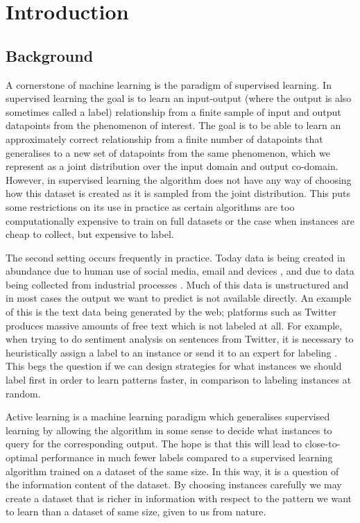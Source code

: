 \chapter{Introduction}
\label{ch:introduction}

\section{Background}
\label{sec:background}
A cornerstone of machine learning is the paradigm of supervised learning. In
supervised learning the goal is to learn an input-output (where the output is
also sometimes called a label) relationship from a finite sample of input and
output datapoints from the phenomenon of interest. The goal is to be able to
learn an approximately correct relationship from a finite number of datapoints
that generalises to a new set of datapoints from the same phenomenon, which we
represent as a joint distribution over the input domain and output co-domain.
However, in supervised learning the algorithm does not have any way of choosing
how this dataset is created as it is sampled from the joint distribution. This
puts some restrictions on its use in practice as certain algorithms are too
computationally expensive to train on full datasets or the case when instances
are cheap to collect, but expensive to label.

The second setting occurs frequently in practice. Today data is being created in
abundance due to human use of social media, email and devices
\citep{desjardins19_how}, and due to data being collected from industrial processes
\citep{qin14_proces_data_analy_era_big_data}. Much of this data is unstructured and
in most cases the output we want to predict is not available directly. An
example of this is the text data being generated by the web; platforms such as
Twitter produces massive amounts of free text which is not labeled at all. For
example, when trying to do sentiment analysis on sentences from Twitter, it is
necessary to heuristically assign a label to an instance or send it to an expert
for labeling \citep{pak10_twitt}. This begs the question if we can design
strategies for what instances we should label first in order to learn patterns
faster, in comparison to labeling instances at random.

Active learning \citep{cohn94_improv_gener_with_activ_learn} is a machine learning
paradigm which generalises supervised learning by allowing the algorithm in some
sense to decide what instances to query for the corresponding output. The hope
is that this will lead to close-to-optimal performance in much fewer labels
compared to a supervised learning algorithm trained on a dataset of the same
size. In this way, it is a question of the information content of the dataset.
By choosing instances carefully we may create a dataset that is richer in
information with respect to the pattern we want to learn than a dataset of same
size, given to us from nature.

